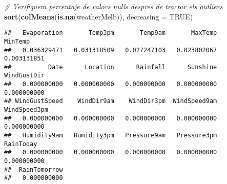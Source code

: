 \documentclass[
]{article}
\newenvironment{Shaded}{\begin{snugshade}}{\end{snugshade}}
\newcommand{\CommentTok}[1]{\textcolor[rgb]{0.56,0.35,0.01}{\textit{#1}}}
\newcommand{\ControlFlowTok}[1]{\textcolor[rgb]{0.13,0.29,0.53}{\textbf{#1}}}
\newcommand{\DataTypeTok}[1]{\textcolor[rgb]{0.13,0.29,0.53}{#1}}
\newcommand{\DecValTok}[1]{\textcolor[rgb]{0.00,0.00,0.81}{#1}}
\newcommand{\KeywordTok}[1]{\textcolor[rgb]{0.13,0.29,0.53}{\textbf{#1}}}
\newcommand{\NormalTok}[1]{#1}
\newcommand{\OperatorTok}[1]{\textcolor[rgb]{0.81,0.36,0.00}{\textbf{#1}}}
\newcommand{\OtherTok}[1]{\textcolor[rgb]{0.56,0.35,0.01}{#1}}
\newcommand{\StringTok}[1]{\textcolor[rgb]{0.31,0.60,0.02}{#1}}
\begin{document}
\begin{Shaded}
\end{Shaded}

\begin{Shaded}
\begin{Highlighting}[]
\CommentTok{# Verifiquem percentaje de valors nulls despres de tractar els outliers}
\KeywordTok{sort}\NormalTok{(}\KeywordTok{colMeans}\NormalTok{(}\KeywordTok{is.na}\NormalTok{(weatherMelb)), }\DataTypeTok{decreasing =} \OtherTok{TRUE}\NormalTok{)}
\end{Highlighting}
\end{Shaded}

\begin{verbatim}
##   Evaporation       Temp3pm       Temp9am       MaxTemp       MinTemp 
##   0.036329471   0.031318509   0.027247103   0.023802067   0.003131851 
##          Date      Location      Rainfall      Sunshine   WindGustDir 
##   0.000000000   0.000000000   0.000000000   0.000000000   0.000000000 
## WindGustSpeed    WindDir9am    WindDir3pm  WindSpeed9am  WindSpeed3pm 
##   0.000000000   0.000000000   0.000000000   0.000000000   0.000000000 
##   Humidity9am   Humidity3pm   Pressure9am   Pressure3pm     RainToday 
##   0.000000000   0.000000000   0.000000000   0.000000000   0.000000000 
##  RainTomorrow 
##   0.000000000
\end{verbatim}
\end{document}
